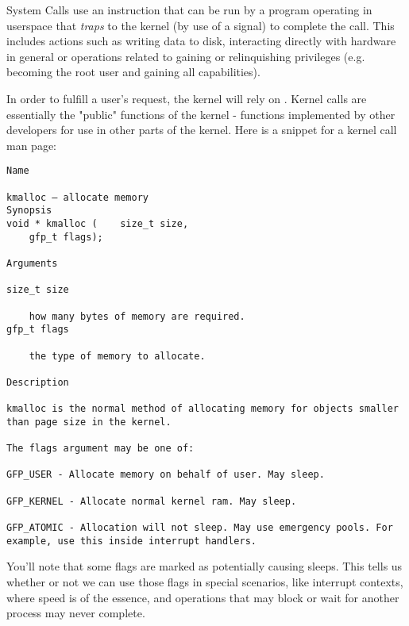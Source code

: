 System Calls use an instruction that can be run by a program operating in userspace that \textit{traps} to the kernel (by use of a signal) to complete the call.
This includes actions such as writing data to disk, interacting directly with hardware in general or operations related to gaining or relinquishing privileges (e.g.  becoming the root user and gaining all capabilities).

In order to fulfill a user's request, the kernel will rely on .
Kernel calls are essentially the "public" functions of the kernel - functions implemented by other developers for use in other parts of the kernel.
Here is a snippet for a kernel call man page:

\begin{lstlisting}
Name

kmalloc — allocate memory
Synopsis
void * kmalloc (	size_t size,
 	gfp_t flags);

Arguments

size_t size

    how many bytes of memory are required.
gfp_t flags

    the type of memory to allocate.

Description

kmalloc is the normal method of allocating memory for objects smaller than page size in the kernel.

The flags argument may be one of:

GFP_USER - Allocate memory on behalf of user. May sleep.

GFP_KERNEL - Allocate normal kernel ram. May sleep.

GFP_ATOMIC - Allocation will not sleep. May use emergency pools. For example, use this inside interrupt handlers.
\end{lstlisting}

You'll note that some flags are marked as potentially causing sleeps.
This tells us whether or not we can use those flags in special scenarios, like interrupt contexts, where speed is of the essence, and operations that may block or wait for another process may never complete.


